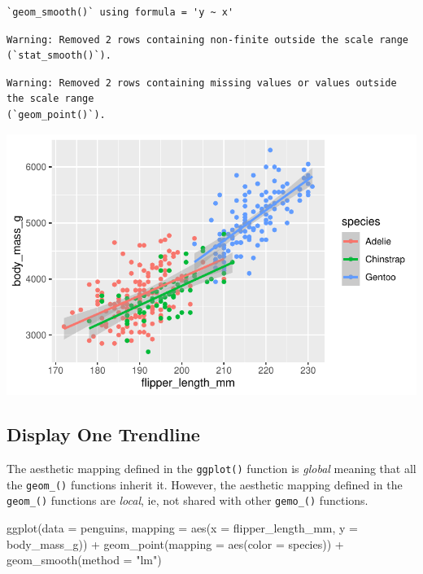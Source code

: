 \documentclass[
  letterpaper,
  DIV=11,
  numbers=noendperiod]{scrreprt}
\newenvironment{Shaded}{\begin{snugshade}}{\end{snugshade}}
\newcommand{\AttributeTok}[1]{\textcolor[rgb]{0.40,0.45,0.13}{#1}}
\newcommand{\FunctionTok}[1]{\textcolor[rgb]{0.28,0.35,0.67}{#1}}
\newcommand{\NormalTok}[1]{\textcolor[rgb]{0.00,0.23,0.31}{#1}}
\newcommand{\SpecialCharTok}[1]{\textcolor[rgb]{0.37,0.37,0.37}{#1}}
\newcommand{\StringTok}[1]{\textcolor[rgb]{0.13,0.47,0.30}{#1}}
\begin{document}
\begin{verbatim}
`geom_smooth()` using formula = 'y ~ x'
\end{verbatim}

\begin{verbatim}
Warning: Removed 2 rows containing non-finite outside the scale range
(`stat_smooth()`).
\end{verbatim}

\begin{verbatim}
Warning: Removed 2 rows containing missing values or values outside the scale range
(`geom_point()`).
\end{verbatim}

\includegraphics{src/r-for-data-science/01-data-viz_files/figure-pdf/unnamed-chunk-11-1.pdf}

\subsection{Display One Trendline}\label{display-one-trendline}

The aesthetic mapping defined in the \texttt{ggplot()} function is
\emph{global} meaning that all the \texttt{geom\_()} functions inherit
it. However, the aesthetic mapping defined in the \texttt{geom\_()}
functions are \emph{local}, ie, not shared with other \texttt{gemo\_()}
functions.

\begin{Shaded}
\begin{Highlighting}[]
\FunctionTok{ggplot}\NormalTok{(}\AttributeTok{data =}\NormalTok{ penguins,}
       \AttributeTok{mapping =} \FunctionTok{aes}\NormalTok{(}\AttributeTok{x =}\NormalTok{ flipper\_length\_mm, }\AttributeTok{y =}\NormalTok{ body\_mass\_g)) }\SpecialCharTok{+}
  \FunctionTok{geom\_point}\NormalTok{(}\AttributeTok{mapping =} \FunctionTok{aes}\NormalTok{(}\AttributeTok{color =}\NormalTok{ species)) }\SpecialCharTok{+}
  \FunctionTok{geom\_smooth}\NormalTok{(}\AttributeTok{method =} \StringTok{"lm"}\NormalTok{)}
\end{Highlighting}
\end{Shaded}
\end{document}
